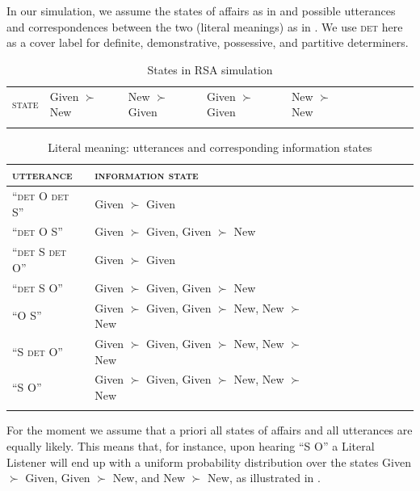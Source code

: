 \documentclass[output=paper,modfonts,nonflat]{langsci/langscibook}
\begin{document}
In our simulation, we assume the states of affairs as in  and possible utterances and correspondences between the two (literal meanings) as in . We use {\scshape det} here as a cover label for definite, demonstrative, possessive, and partitive determiners.

\begin{table}
\begin{tabular}{llllllllll}
\lsptoprule
{\scshape state} & Given $\succ$ New & New $\succ$ Given & Given $\succ$ Given & New $\succ$ New \\
\lspbottomrule
\end{tabular}
\caption{States in RSA simulation}\label{states}
\end{table}

\begin{table}
\begin{tabular}{llllllllll}
\lsptoprule
{\scshape utterance} & {\scshape information state} \\\midrule
``{\scshape det} O {\scshape det} S'' & Given $\succ$ Given\\ 
``{\scshape det} O S'' & Given $\succ$ Given, Given $\succ$ New\\
``{\scshape det} S {\scshape det} O'' & Given $\succ$ Given\\
``{\scshape det} S O'' & Given $\succ$ Given, Given $\succ$ New\\
``O S'' & Given $\succ$ Given, Given $\succ$ New, New $\succ$ New\\
``S {\scshape det} O'' & Given $\succ$ Given, Given $\succ$ New, New $\succ$ New\\
``S O'' & Given $\succ$ Given, Given $\succ$ New, New $\succ$ New\\
\lspbottomrule
\end{tabular}
\caption{Literal meaning: utterances and corresponding information states}\label{table:meanings}
\end{table}

For the moment we assume that a priori all states of affairs and all utterances are equally likely. This means that, for instance, upon hearing ``S O'' a Literal Listener will end up with a uniform probability distribution over the states Given $\succ$ Given, Given $\succ$ New, and New $\succ$ New, as illustrated in .
\end{document}
